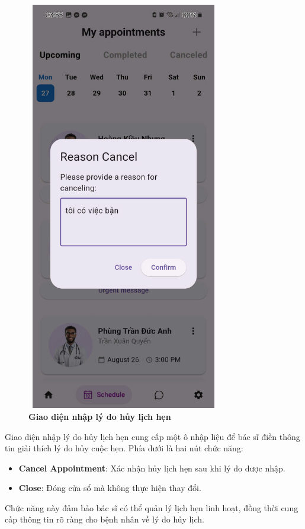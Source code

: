 \begin{figure}[H]
	\centering
	\includegraphics[width=8.5cm,height=18cm]{Images/AppUI/cancelledSchedule.jpg}
	\caption[Giao diện nhập lý do hủy lịch hẹn]{\bfseries \fontsize{12pt}{0pt}\selectfont Giao diện nhập lý do hủy lịch hẹn}
	\label{cancelAppointment}
\end{figure}
Giao diện nhập lý do hủy lịch hẹn cung cấp một ô nhập liệu để bác sĩ điền thông tin giải thích lý do hủy cuộc hẹn. Phía dưới là hai nút chức năng:
\begin{itemize}
	\item \textbf{Cancel Appointment}: Xác nhận hủy lịch hẹn sau khi lý do được nhập.
	\item \textbf{Close}: Đóng cửa sổ mà không thực hiện thay đổi.
\end{itemize}
Chức năng này đảm bảo bác sĩ có thể quản lý lịch hẹn linh hoạt, đồng thời cung cấp thông tin rõ ràng cho bệnh nhân về lý do hủy lịch.


